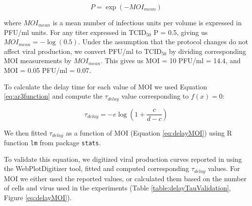 \begin{equation}
P = \exp(-MOI_{mean})
\end{equation}

where $MOI_{mean}$ is a mean number of infectious units per volume is expressed in PFU/ml units. For any titer expressed in TCID$_{50}$ P = 0.5, giving us $MOI_{mean} = -\log(0.5)$. Under the assumption that the protocol changes do not affect viral production, we convert PFU/ml to TCID$_{50}$ by dividing corresponding MOI measurements by $MOI_{mean}$. This gives us MOI = 10 PFU/ml = 14.4, and MOI = 0.05 PFU/ml = 0.07.

To calculate the delay time for each value of MOI we used Equation \ref{eq:ar3function} and compute the $\tau_{delay}$ value corresponding to $f(x) = 0$:

\begin{equation}
\tau_{delay} = -e\log(1+\frac{c}{d-c})
\end{equation}

We then fitted $\tau_{delay}$ as a function of MOI (Equation \ref{eq:delayMOI}) using R function \texttt{lm} from package \texttt{stats}.

To validate this equation, we digitized viral production curves reported in \cite{baccam2006kinetics, handel2007neuraminidase, handel2010towards, smith2011effect, miao2010quantifying, mohler2005mathematical} using the WebPlotDigitizer \cite{Rohatgi2020} tool, fitted and computed corresponding $\tau_{delay}$ values. For MOI we either used the reported values, or calculated them based on the number of cells and virus used in the experiments (Table \ref{table:delayTauValidation}, Figure \ref{eq:delayMOI}).

